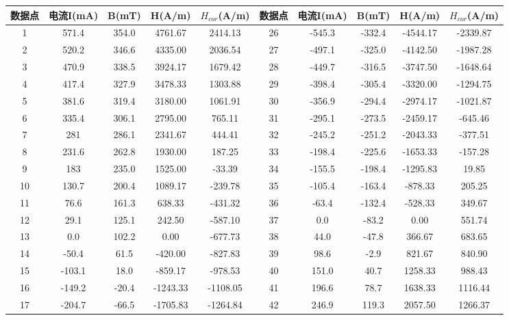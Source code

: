 \documentclass[11pt]{article}
\begin{document}
\begin{table}[!ht]
    \centering
    \begin{tabular}{ccccc|ccccc}
        \toprule
        数据点 & 电流I(mA) & B(mT) & H(A/m) & $H_{cor}$(A/m) & 数据点 & 电流I(mA) & B(mT) & H(A/m) & $H_{cor}$(A/m)\\ \midrule
        1 & 571.4 & 354.0 & 4761.67  & 2414.13  & 26 & -545.3 & -332.4 & -4544.17  & -2339.87  \\ 
        2 & 520.2 & 346.6 & 4335.00  & 2036.54  & 27 & -497.1 & -325.0  & -4142.50  & -1987.28  \\ 
        3 & 470.9 & 338.5 & 3924.17  & 1679.42  & 28 & -449.7 & -316.5 & -3747.50  & -1648.64  \\ 
        4 & 417.4 & 327.9 & 3478.33  & 1303.88  & 29 & -398.4 & -305.4 & -3320.00  & -1294.75  \\ 
        5 & 381.6 & 319.4 & 3180.00  & 1061.91  & 30 & -356.9 & -294.4 & -2974.17  & -1021.87  \\ 
        6 & 335.4 & 306.1 & 2795.00  & 765.11  & 31 & -295.1 & -273.5 & -2459.17  & -645.46  \\ 
        7 & 281 & 286.1 & 2341.67  & 444.41  & 32 & -245.2 & -251.2 & -2043.33  & -377.51  \\ 
        8 & 231.6 & 262.8 & 1930.00  & 187.25  & 33 & -198.4 & -225.6 & -1653.33  & -157.28  \\ 
        9 & 183 & 235.0  & 1525.00  & -33.39  & 34 & -155.5 & -198.4 & -1295.83  & 19.85  \\ 
        10 & 130.7 & 200.4 & 1089.17  & -239.78  & 35 & -105.4 & -163.4 & -878.33  & 205.25  \\ 
        11 & 76.6 & 161.3 & 638.33  & -431.32  & 36 & -63.4 & -132.4 & -528.33  & 349.67  \\ 
        12 & 29.1 & 125.1 & 242.50  & -587.10  & 37 & 0.0 & -83.2 & 0.00  & 551.74  \\ 
        13 & 0.0 & 102.2 & 0.00  & -677.73  & 38 & 44.0 & -47.8 & 366.67  & 683.65  \\ 
        14 & -50.4 & 61.5 & -420.00  & -827.83  & 39 & 98.6 & -2.9 & 821.67  & 840.90  \\ 
        15 & -103.1 & 18.0 & -859.17  & -978.53  & 40 & 151.0 & 40.7 & 1258.33  & 988.43  \\ 
        16 & -149.2 & -20.4 & -1243.33  & -1108.05  & 41 & 196.6 & 78.7 & 1638.33  & 1116.44  \\ 
        17 & -204.7 & -66.5 & -1705.83  & -1264.84  & 42 & 246.9 & 119.3 & 2057.50  & 1266.37  \\ 

\end{tabular}
\end{table}
\end{document}
